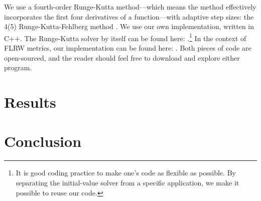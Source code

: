 \documentclass[]{article}
\begin{document}
We use a fourth-order Runge-Kutta method---which means the method
effectively incorporates the first four derivatives of a
function---with adaptive step sizes: the 4(5) Runge-Kutta-Fehlberg
method \cite{Fehlberg}. We use our own implementation, written in
C++. The Runge-Kutta solver by itself can be found here:
\cite{RKF45}.\footnote{It is good coding practice to make one's code as
  flexible as possible. By separating the initial-value solver from a
  specific application, we make it possible to reuse our code.} In the
context of FLRW metrics, our implementation can be found here:
\cite{FLRWCode}. Both pieces of code are open-sourced, and the reader
should feel free to download and explore either program.

\section{Results}
\label{sec:results}

\section{Conclusion}
\label{sec:conclusion}



\end{document}
